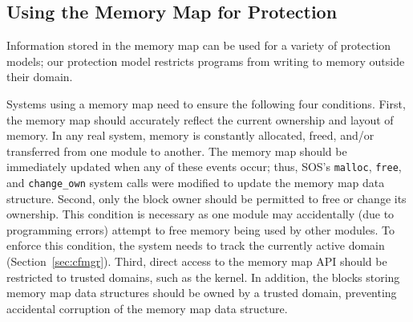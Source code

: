 \subsection{Using the Memory Map for Protection}
\label{sec:mmap_for_protection}
%
Information stored in the memory map can be used for a variety of protection models;
%
our protection model restricts programs from writing to memory outside their domain.
%
%


%
Systems using a memory map need to ensure the following four conditions.
%
First, the memory map should accurately reflect the current ownership and
layout of memory.
%
In any real system, memory is constantly allocated, freed, and/or
transferred from one module to another.
%
The memory map should be immediately updated when any of these events
occur; thus, SOS's
%
\texttt{malloc}, \texttt{free}, and
\texttt{change\_own} system calls were modified to update the memory
map data structure. 
%
Second, only the block owner should be permitted to free or change its ownership.
%
This condition is necessary as one module may accidentally (due to
programming errors) attempt to free memory being used by other
modules.
%
%
To enforce this condition, the system needs to track the currently
active domain (Section~\ref{sec:cfmgr}).
%
%
Third, direct access to the memory map API %
should be restricted to trusted domains, such as the kernel.
%
%
%
In addition, the blocks storing memory map data structures should be owned
by a trusted domain, preventing
%
accidental corruption of the memory map data structure.
%


